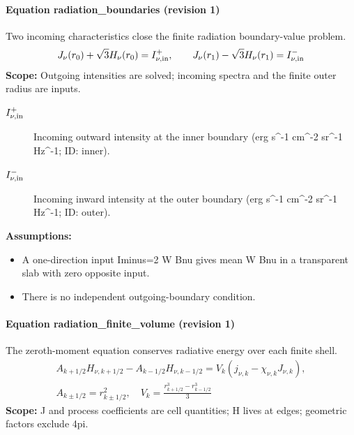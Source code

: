 \paragraph{Equation radiation\_boundaries (revision 1)}
Two incoming characteristics close the finite radiation boundary-value problem.
\begin{equation}
\begin{aligned}
J_\nu(r_0)+\sqrt3H_\nu(r_0)=I_{\nu,\rm in}^{+},\qquad J_\nu(r_1)-\sqrt3H_\nu(r_1)=I_{\nu,\rm in}^{-}
\end{aligned}
\label{eq:escape.coupled_5f_hydrogen:radiation_5f_boundaries:1}
\end{equation}
\noindent\textbf{Scope:} Outgoing intensities are solved; incoming spectra and the finite outer radius are inputs.

\begin{description}
\item[$I_{\nu,\rm in}^{+}$] Incoming outward intensity at the inner boundary (erg s\textasciicircum{}-1 cm\textasciicircum{}-2 sr\textasciicircum{}-1 Hz\textasciicircum{}-1; ID: inner).
\item[$I_{\nu,\rm in}^{-}$] Incoming inward intensity at the outer boundary (erg s\textasciicircum{}-1 cm\textasciicircum{}-2 sr\textasciicircum{}-1 Hz\textasciicircum{}-1; ID: outer).
\end{description}

\noindent\textbf{Assumptions:}
\begin{itemize}
\item A one-direction input Iminus=2 W Bnu gives mean W Bnu in a transparent slab with zero opposite input.
\item There is no independent outgoing-boundary condition.
\end{itemize}

\paragraph{Equation radiation\_finite\_volume (revision 1)}
The zeroth-moment equation conserves radiative energy over each finite shell.
\begin{equation}
\begin{aligned}
A_{k+1/2}H_{\nu,k+1/2}-A_{k-1/2}H_{\nu,k-1/2}=V_k(j_{\nu,k}-\chi_{\nu,k}J_{\nu,k}),\\A_{k\pm1/2}=r_{k\pm1/2}^2,\quad V_k=\frac{r_{k+1/2}^3-r_{k-1/2}^3}{3}
\end{aligned}
\label{eq:escape.coupled_5f_hydrogen:radiation_5f_finite_5f_volume:1}
\end{equation}
\noindent\textbf{Scope:} J and process coefficients are cell quantities; H lives at edges; geometric factors exclude 4pi.

